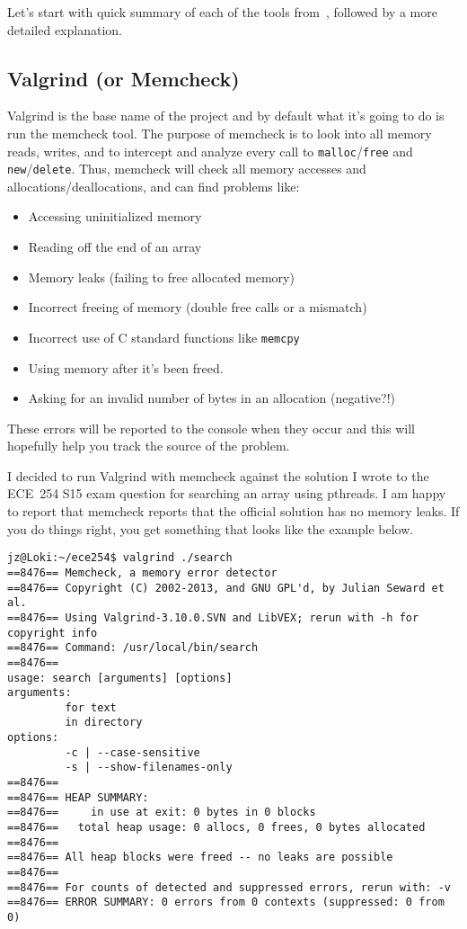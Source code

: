 Let's start with quick summary of each of the tools from~\cite{valgrind:tools}, followed by a more detailed explanation.

\subsection*{Valgrind (or Memcheck) }
Valgrind is the base name of the project and by default what it's going to do is run the memcheck tool. The purpose of memcheck is to look into all memory reads, writes, and to intercept and analyze every call to \texttt{malloc}/\texttt{free} and \texttt{new}/\texttt{delete}. Thus, memcheck will check all memory accesses and allocations/deallocations, and can find problems like:
\begin{itemize}
	\item Accessing uninitialized memory
	\item Reading off the end of an array
	\item Memory leaks (failing to free allocated memory)
	\item Incorrect freeing of memory (double free calls or a mismatch)
	\item Incorrect use of C standard functions like \texttt{memcpy}
	\item Using memory after it's been freed.
	\item Asking for an invalid number of bytes in an allocation (negative?!)
\end{itemize}

These errors will be reported to the console when they occur and this will hopefully help you track the source of the problem. 

I decided to run Valgrind with memcheck against the solution I wrote to the ECE~254 S15 exam question for searching an array using pthreads. I am happy to report that memcheck reports that the official solution has no memory leaks. If you do things right, you get something that looks like the example below. 
\begin{verbatim}
jz@Loki:~/ece254$ valgrind ./search
==8476== Memcheck, a memory error detector
==8476== Copyright (C) 2002-2013, and GNU GPL'd, by Julian Seward et al.
==8476== Using Valgrind-3.10.0.SVN and LibVEX; rerun with -h for copyright info
==8476== Command: /usr/local/bin/search
==8476== 
usage: search [arguments] [options]
arguments:
         for text
         in directory
options:
         -c | --case-sensitive
         -s | --show-filenames-only
==8476== 
==8476== HEAP SUMMARY:
==8476==     in use at exit: 0 bytes in 0 blocks
==8476==   total heap usage: 0 allocs, 0 frees, 0 bytes allocated
==8476== 
==8476== All heap blocks were freed -- no leaks are possible
==8476== 
==8476== For counts of detected and suppressed errors, rerun with: -v
==8476== ERROR SUMMARY: 0 errors from 0 contexts (suppressed: 0 from 0)
\end{verbatim}


